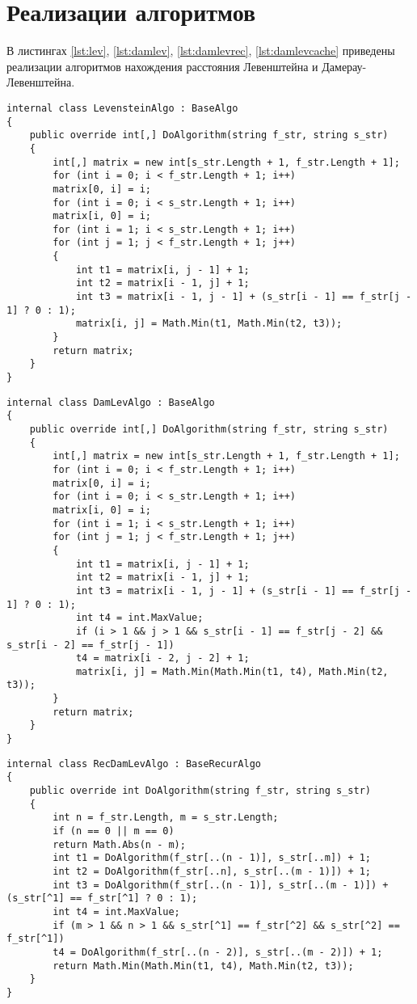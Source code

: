 \section{Реализации алгоритмов}

 В листингах \ref{lst:lev}, \ref{lst:damlev}, \ref{lst:damlevrec}, \ref{lst:damlevcache} приведены реализации алгоритмов нахождения расстояния Левенштейна и Дамерау-Левенштейна.
\begin{lstlisting}[label=lst:lev,caption=Класс с алгоритмом нахождения расстояния Левенштейна.]
internal class LevensteinAlgo : BaseAlgo
{
	public override int[,] DoAlgorithm(string f_str, string s_str)
	{
		int[,] matrix = new int[s_str.Length + 1, f_str.Length + 1];
		for (int i = 0; i < f_str.Length + 1; i++)
		matrix[0, i] = i;
		for (int i = 0; i < s_str.Length + 1; i++)
		matrix[i, 0] = i;
		for (int i = 1; i < s_str.Length + 1; i++)
		for (int j = 1; j < f_str.Length + 1; j++)
		{
			int t1 = matrix[i, j - 1] + 1;
			int t2 = matrix[i - 1, j] + 1;
			int t3 = matrix[i - 1, j - 1] + (s_str[i - 1] == f_str[j - 1] ? 0 : 1);
			matrix[i, j] = Math.Min(t1, Math.Min(t2, t3));
		}
		return matrix;
	}
}
\end{lstlisting}

\begin{lstlisting}[label=lst:damlev,caption=Класс с алгоритмом нахождения расстояния Дамерау-Левенштейна.]
internal class DamLevAlgo : BaseAlgo
{
	public override int[,] DoAlgorithm(string f_str, string s_str)
	{
		int[,] matrix = new int[s_str.Length + 1, f_str.Length + 1];
		for (int i = 0; i < f_str.Length + 1; i++)
		matrix[0, i] = i;
		for (int i = 0; i < s_str.Length + 1; i++)
		matrix[i, 0] = i;
		for (int i = 1; i < s_str.Length + 1; i++)
		for (int j = 1; j < f_str.Length + 1; j++)
		{
			int t1 = matrix[i, j - 1] + 1;
			int t2 = matrix[i - 1, j] + 1;
			int t3 = matrix[i - 1, j - 1] + (s_str[i - 1] == f_str[j - 1] ? 0 : 1);
			int t4 = int.MaxValue;
			if (i > 1 && j > 1 && s_str[i - 1] == f_str[j - 2] && s_str[i - 2] == f_str[j - 1])
			t4 = matrix[i - 2, j - 2] + 1;
			matrix[i, j] = Math.Min(Math.Min(t1, t4), Math.Min(t2, t3));
		}
		return matrix;
	}
}
\end{lstlisting}

\begin{lstlisting}[label=lst:damlevrec,caption=Класс с алгоритмом нахождения расстояния Дамерау-Левенштейна с использованием рекурсии.]
internal class RecDamLevAlgo : BaseRecurAlgo
{
	public override int DoAlgorithm(string f_str, string s_str)
	{
		int n = f_str.Length, m = s_str.Length;
		if (n == 0 || m == 0)
		return Math.Abs(n - m);
		int t1 = DoAlgorithm(f_str[..(n - 1)], s_str[..m]) + 1;
		int t2 = DoAlgorithm(f_str[..n], s_str[..(m - 1)]) + 1;
		int t3 = DoAlgorithm(f_str[..(n - 1)], s_str[..(m - 1)]) + (s_str[^1] == f_str[^1] ? 0 : 1);
		int t4 = int.MaxValue;
		if (m > 1 && n > 1 && s_str[^1] == f_str[^2] && s_str[^2] == f_str[^1])
		t4 = DoAlgorithm(f_str[..(n - 2)], s_str[..(m - 2)]) + 1;
		return Math.Min(Math.Min(t1, t4), Math.Min(t2, t3));
	}
}
\end{lstlisting}

